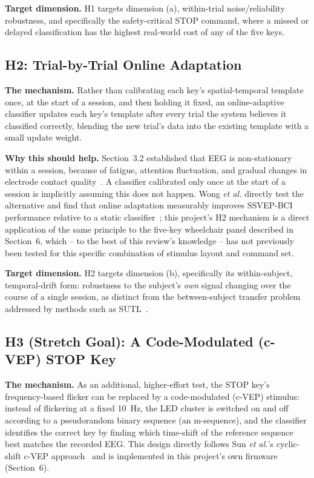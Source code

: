 \documentclass[11pt]{article}
\begin{document}
\textbf{Target dimension.} H1 targets dimension (a), within-trial noise/reliability robustness, and specifically the safety-critical STOP command, where a missed or delayed classification has the highest real-world cost of any of the five keys.

\subsection{H2: Trial-by-Trial Online Adaptation}

\textbf{The mechanism.} Rather than calibrating each key's spatial-temporal template once, at the start of a session, and then holding it fixed, an online-adaptive classifier updates each key's template after every trial the system believes it classified correctly, blending the new trial's data into the existing template with a small update weight.

\textbf{Why this should help.} Section~3.2 established that EEG is non-stationary within a session, because of fatigue, attention fluctuation, and gradual changes in electrode contact quality~\cite{nicolasalonso2012bci}. A classifier calibrated only once at the start of a session is implicitly assuming this does not happen. Wong \textit{et al.} directly test the alternative and find that online adaptation measurably improves SSVEP-BCI performance relative to a static classifier~\cite{wong2022onlineadaptation}; this project's H2 mechanism is a direct application of the same principle to the five-key wheelchair panel described in Section~6, which -- to the best of this review's knowledge -- has not previously been tested for this specific combination of stimulus layout and command set.

\textbf{Target dimension.} H2 targets dimension (b), specifically its within-subject, temporal-drift form: robustness to the subject's \emph{own} signal changing over the course of a single session, as distinct from the between-subject transfer problem addressed by methods such as SUTL~\cite{li2024sutl}.

\subsection{H3 (Stretch Goal): A Code-Modulated (c-VEP) STOP Key}

\textbf{The mechanism.} As an additional, higher-effort test, the STOP key's frequency-based flicker can be replaced by a code-modulated (c-VEP) stimulus: instead of flickering at a fixed 10~Hz, the LED cluster is switched on and off according to a pseudorandom binary sequence (an m-sequence), and the classifier identifies the correct key by finding which time-shift of the reference sequence best matches the recorded EEG. This design directly follows Sun \textit{et al.}'s cyclic-shift c-VEP approach~\cite{sun2022cyclicshift} and is implemented in this project's own firmware (Section~6).
\end{document}
